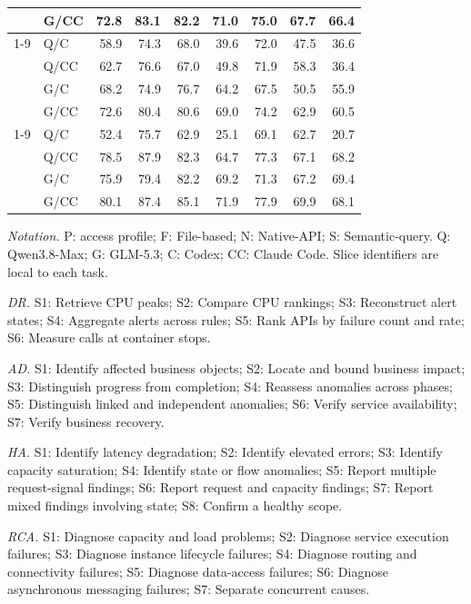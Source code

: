 \begin{table}[t]
\begin{minipage}[t]{0.49\textwidth}
\begin{tabular*}{\linewidth}{@{\extracolsep{\fill}}ll*{7}{r}@{}}
 & G/CC & 72.8 & 83.1 & 82.2 & 71.0 & 75.0 & 67.7 & 66.4 \\
\cmidrule(lr){1-9}
\multirow{4}{*}{N} & Q/C & 58.9 & 74.3 & 68.0 & 39.6 & 72.0 & 47.5 & 36.6 \\
 & Q/CC & 62.7 & 76.6 & 67.0 & 49.8 & 71.9 & 58.3 & 36.4 \\
 & G/C & 68.2 & 74.9 & 76.7 & 64.2 & 67.5 & 50.5 & 55.9 \\
 & G/CC & 72.6 & 80.4 & 80.6 & 69.0 & 74.2 & 62.9 & 60.5 \\
\cmidrule(lr){1-9}
\multirow{4}{*}{S} & Q/C & 52.4 & 75.7 & 62.9 & 25.1 & 69.1 & 62.7 & 20.7 \\
 & Q/CC & 78.5 & 87.9 & 82.3 & 64.7 & 77.3 & 67.1 & 68.2 \\
 & G/C & 75.9 & 79.4 & 82.2 & 69.2 & 71.3 & 67.2 & 69.4 \\
 & G/CC & 80.1 & 87.4 & 85.1 & 71.9 & 77.9 & 69.9 & 68.1 \\
\bottomrule
\end{tabular*}
\end{minipage}
\par\vspace{4pt}
\begin{minipage}{\textwidth}
\footnotesize
\textit{Notation.}
P: access profile; F: File-based; N: Native-API; S: Semantic-query.
Q: Qwen3.8-Max; G: GLM-5.3; C: Codex; CC: Claude Code.
Slice identifiers are local to each task.\par
\textit{DR.} S1: Retrieve CPU peaks; S2: Compare CPU rankings; S3: Reconstruct alert states; S4: Aggregate alerts across rules; S5: Rank APIs by failure count and rate; S6: Measure calls at container stops.\par
\textit{AD.} S1: Identify affected business objects; S2: Locate and bound business impact; S3: Distinguish progress from completion; S4: Reassess anomalies across phases; S5: Distinguish linked and independent anomalies; S6: Verify service availability; S7: Verify business recovery.\par
\textit{HA.} S1: Identify latency degradation; S2: Identify elevated errors; S3: Identify capacity saturation; S4: Identify state or flow anomalies; S5: Report multiple request-signal findings; S6: Report request and capacity findings; S7: Report mixed findings involving state; S8: Confirm a healthy scope.\par
\textit{RCA.} S1: Diagnose capacity and load problems; S2: Diagnose service execution failures; S3: Diagnose instance lifecycle failures; S4: Diagnose routing and connectivity failures; S5: Diagnose data-access failures; S6: Diagnose asynchronous messaging failures; S7: Separate concurrent causes.\par
\end{minipage}
\end{table}
